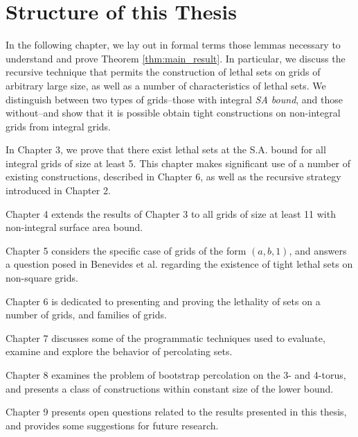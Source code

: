 \section{Structure of this Thesis}

In the following chapter, we lay out in formal terms those lemmas necessary to understand and prove Theorem \ref{thm:main_result}. In particular, we discuss the recursive technique that permits the construction of lethal sets on grids of arbitrary large size, as well as a number of characteristics of lethal sets. We distinguish between two types of grids--those with integral \emph{SA bound}, and those without--and show that it is possible obtain tight constructions on non-integral grids from integral grids. 

In Chapter 3, we prove that there exist lethal sets at the S.A. bound for all integral grids of size at least 5. This chapter makes significant use of a number of existing constructions, described in Chapter 6, as well as the recursive strategy introduced in Chapter 2. 

Chapter 4 extends the results of Chapter 3 to all grids of size at least 11 with non-integral surface area bound. 

Chapter 5 considers the specific case of grids of the form $(a,b,1)$, and answers a question posed in Benevides et al. \cite{benevides:2022} regarding the existence of tight lethal sets on non-square grids. 

Chapter 6 is dedicated to presenting and proving the lethality of sets on a number of grids, and families of grids. 

Chapter 7 discusses some of the programmatic techniques used to evaluate, examine and explore the behavior of percolating sets. 

Chapter 8 examines the problem of bootstrap percolation on the 3- and 4-torus, and presents a class of constructions within constant size of the lower bound. 

Chapter 9 presents open questions related to the results presented in this thesis, and provides some suggestions for future research.



